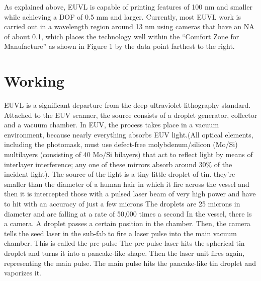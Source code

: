 \documentclass[12pt,a4paper]{report}
\begin{document}
As explained above, EUVL is capable of printing features
of 100 nm and smaller while achieving a DOF of 0.5 mm
and larger. Currently, most EUVL work is carried out in
a wavelength region around 13 nm using cameras that
have an NA of about 0.1, which places the technology
well within the “Comfort Zone for Manufacture” as
shown in Figure 1 by the data point farthest to the right.




\section{Working}

EUVL is a significant departure from the deep 
ultraviolet lithography standard. 
Attached to the EUV scanner, the source consists 
of a droplet generator, collector and a vacuum chamber. 
In EUV, the process takes place in a vacuum 
environment, because nearly everything absorbs 
EUV light.(All optical elements, including the photomask,
 must use defect-free molybdenum/silicon (Mo/Si) 
 multilayers (consisting of 40 Mo/Si bilayers) that 
act to reflect light by means of interlayer 
interference; any one of these mirrors absorb
 around 30\% 
of the incident light). The source of the light is a tiny little droplet of tin.
they're smaller than 
the diameter of a human hair in which it fire 
across the vessel and then it is intercepted those 
with a pulsed laser 
beam of very high power and have to hit with 
an accuracy of just a few microns
The droplets are 25 microns in diameter and 
are falling at a rate of 50,000 times a second
In the vessel, there is a camera. A droplet 
passes a certain position in the chamber. 
Then, the camera tells the seed laser in the 
sub-fab to fire a laser pulse into the main 
vacuum chamber. This is called the pre-pulse
The pre-pulse laser hits the spherical tin droplet 
and turns it into a pancake-like shape. Then the laser 
unit fires again, representing the main pulse. 
The main pulse hits the pancake-like tin droplet
 and vaporizes it.
\end{document}
